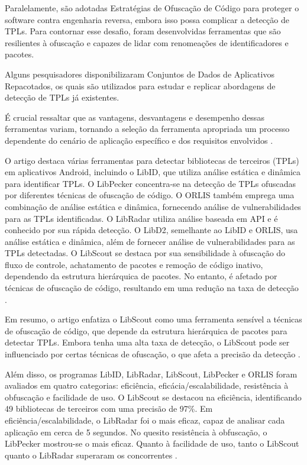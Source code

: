 Paralelamente, são adotadas Estratégias de Ofuscação de Código para proteger o software contra engenharia reversa, embora isso possa complicar a detecção de TPLs. Para contornar esse desafio, foram desenvolvidas ferramentas que são resilientes à ofuscação e capazes de lidar com renomeações de identificadores e pacotes.

Alguns pesquisadores disponibilizaram Conjuntos de Dados de Aplicativos Repacotados, os quais são utilizados para estudar e replicar abordagens de detecção de TPLs já existentes.

É crucial ressaltar que as vantagens, desvantagens e desempenho dessas ferramentas variam, tornando a seleção da ferramenta apropriada um processo dependente do cenário de aplicação específico e dos requisitos envolvidos \cite{api_tpl_zhang}.



O artigo destaca várias ferramentas para detectar bibliotecas de terceiros (TPLs) em aplicativos Android, incluindo o LibID, que utiliza análise estática e dinâmica para identificar TPLs. O LibPecker concentra-se na detecção de TPLs ofuscadas por diferentes técnicas de ofuscação de código. O ORLIS também emprega uma combinação de análise estática e dinâmica, fornecendo análise de vulnerabilidades para as TPLs identificadas. O LibRadar utiliza análise baseada em API e é conhecido por sua rápida detecção. O LibD2, semelhante ao LibID e ORLIS, usa análise estática e dinâmica, além de fornecer análise de vulnerabilidades para as TPLs detectadas. O LibScout se destaca por sua sensibilidade à ofuscação do fluxo de controle, achatamento de pacotes e remoção de código inativo, dependendo da estrutura hierárquica de pacotes. No entanto, é afetado por técnicas de ofuscação de código, resultando em uma redução na taxa de detecção \cite{api_tpl_zhang}.

Em resumo, o artigo enfatiza o LibScout como uma ferramenta sensível a técnicas de ofuscação de código, que depende da estrutura hierárquica de pacotes para detectar TPLs. Embora tenha uma alta taxa de detecção, o LibScout pode ser influenciado por certas técnicas de ofuscação, o que afeta a precisão da detecção \cite{api_tpl_zhang}.

Além disso, os programas LibID, LibRadar, LibScout, LibPecker e ORLIS foram avaliados em quatro categorias: eficiência, eficácia/escalabilidade, resistência à obfuscação e facilidade de uso. O LibScout se destacou na eficiência, identificando 49 bibliotecas de terceiros com uma precisão de 97\%. Em eficiência/escalabilidade, o LibRadar foi o mais eficaz, capaz de analisar cada aplicação em cerca de 5 segundos. No quesito resistência à obfuscação, o LibPecker mostrou-se o mais eficaz. Quanto à facilidade de uso, tanto o LibScout quanto o LibRadar superaram os concorrentes \cite{api_tpl_zhang}.

